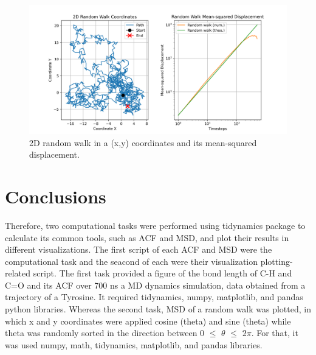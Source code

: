 \documentclass{article}
\begin{document}
\begin{figure}[H]
\centering
\includegraphics[width=\linewidth]{msd_plot.png}
\caption{2D random walk in a (x,y) coordinates and its mean-squared displacement.}
\label{fig:msd_plot}
\end{figure}

\section{Conclusions}

Therefore, two computational tasks were performed using tidynamics package to calculate its common tools, such as ACF and MSD, and plot their results in different visualizations. The first script of each ACF and MSD were the computational task and the seacond of each were their visualization plotting-related script. The first task provided a figure of the bond length of C-H and C=O and its ACF over 700 ns a MD dynamics simulation, data obtained from a trajectory of a Tyrosine. It required tidynamics, numpy, matplotlib, and pandas python libraries. Whereas the second task, MSD of a random walk was plotted, in which x and y coordinates were applied cosine (theta) and sine (theta) while theta was randomly sorted in the direction between 0 $\leq$ $\theta$ $\leq$ $2\pi$. For that, it was used numpy, math, tidynamics, matplotlib, and pandas libraries.



\end{document}
